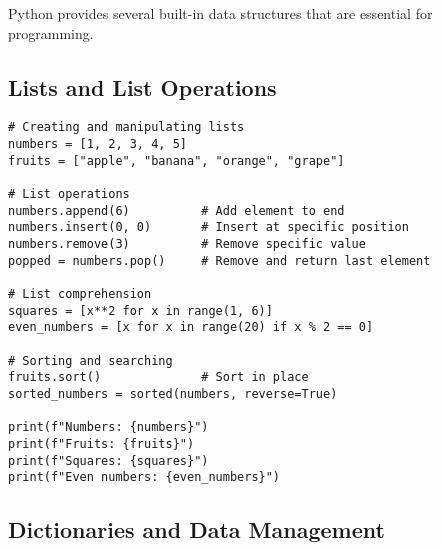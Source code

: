 \documentclass[12pt,a4paper]{article}
\begin{document}
Python provides several built-in data structures that are essential for programming.

\subsection{Lists and List Operations}

\begin{codebox}{}
\begin{lstlisting}[style=python]
# Creating and manipulating lists
numbers = [1, 2, 3, 4, 5]
fruits = ["apple", "banana", "orange", "grape"]

# List operations
numbers.append(6)          # Add element to end
numbers.insert(0, 0)       # Insert at specific position
numbers.remove(3)          # Remove specific value
popped = numbers.pop()     # Remove and return last element

# List comprehension
squares = [x**2 for x in range(1, 6)]
even_numbers = [x for x in range(20) if x % 2 == 0]

# Sorting and searching
fruits.sort()              # Sort in place
sorted_numbers = sorted(numbers, reverse=True)

print(f"Numbers: {numbers}")
print(f"Fruits: {fruits}")
print(f"Squares: {squares}")
print(f"Even numbers: {even_numbers}")
\end{lstlisting}
\end{codebox}

\subsection{Dictionaries and Data Management}
\end{document}
